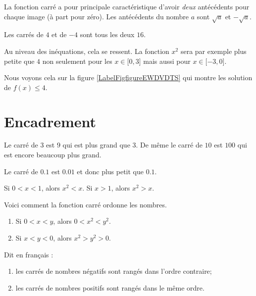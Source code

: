 \begin{Aretenir}
    La fonction carré a pour principale caractéristique d'avoir \emph{deux} antécédents pour chaque image (à part pour zéro). Les antécédents du nombre \( a\) sont \( \sqrt{a}\) et \( -\sqrt{a}\).
\end{Aretenir}

\begin{example}
    Les carrés de \( 4\) et de \( -4\) sont tous les deux \( 16\).
\end{example}

Au niveau des inéquations, cela se ressent. La fonction \( x^2\) sera par exemple plus petite que \( 4\) non seulement pour les \( x\in\mathopen[ 0 , 3 \mathclose]\) mais aussi pour \( x\in\mathopen[ -3 , 0 \mathclose]\).

Nous voyons cela sur la figure \ref{LabelFigfigureEWDVDTS} qui montre les solution de \( f(x)\leq 4\). %
\newcommand{\CaptionFigfigureEWDVDTS}{La résulution graphique d'une inéquation avec la fonction carré.}


\section{Encadrement}

\begin{example}
    Le carré de \( 3\) est \( 9\) qui est plus grand que \( 3\). De même le carré de \( 10\) est \( 100\) qui est encore beaucoup plus grand.

    Le carré de \( 0.1\) est \( 0.01\) et donc plus petit que \( 0.1\).
\end{example}


\begin{Aretenir}
    Si \( 0<x<1\), alors \( x^2<x\). Si \( x>1\), alors \( x^2>x\).
\end{Aretenir}

\begin{Aretenir}
    Voici comment la fonction carré ordonne les nombres.
    \begin{enumerate}
        \item
            Si \( 0<x<y\), alors \( 0<x^2<y^2\).
        \item
            Si \( x<y<0\), alors \( x^2>y^2>0\).
    \end{enumerate}

    Dit en français :
    \begin{enumerate}
        \item
            les carrés de nombres négatifs sont rangés dans l’ordre contraire;
        \item
            les carrés de nombres positifs sont rangés dans le même ordre.
    \end{enumerate}
\end{Aretenir}

